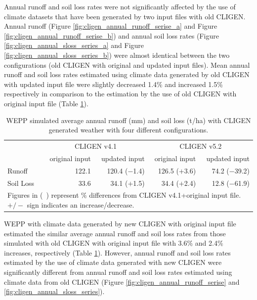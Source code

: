 Annual runoff and soil loss rates were not significantly affected by the use of
climate datasets that have been generated by two input files with old CLIGEN.
Annual runoff (Figure \ref{fig:cligen_annual_runoff_serise_a} and Figure
\ref{fig:cligen_annual_runoff_serise_b}) and annual soil loss rates (Figure
\ref{fig:cligen_annual_sloss_series_a} and Figure
\ref{fig:cligen_annual_sloss_series_b}) were almost identical between the two
configurations (old CLIGEN with original and updated input files). Mean annual
runoff and soil loss rates estimated using climate data generated by old CLIGEN
with updated input file were slightly decreased 1.4\% and increased 1.5\%
respectively in comparison to the estimation by the use of old CLIGEN with
original input file (Table
\ref{tab:SimualtedAnnualRunoffAndSoilLossWithDifferentConfiguration}).

\begin{table}[htbp]
  \centering
  \caption[WEPP simulated average annual runoff and soil loss]{WEPP
simulated average annual runoff (mm) and soil loss (t/ha) with CLIGEN generated
weather with four different configurations.}
  \label{tab:SimualtedAnnualRunoffAndSoilLossWithDifferentConfiguration}
    \begin{tabular}{lrrrr}
      \toprule
       & \multicolumn{2}{c}{CLIGEN v4.1} &
\multicolumn{2}{c}{CLIGEN v5.2}\\
      \cmidrule(r){2-3}\cmidrule(l){4-5}
       & original input & updated input & original input &
updated input \\
      \midrule
      Runoff & 122.1 & 120.4 ($-$1.4) & 126.5 ($+$3.6) & 74.2
($-$39.2)\\
      Soil Loss & 33.6 & 34.1 ($+$1.5) & 34.4 ($+$2.4) & 12.8
($-$61.9)\\
      \bottomrule
      \multicolumn{5}{p{10.5cm}}{\footnotesize Figures in (\ )
represent \% differences from CLIGEN v4.1+original input file. $+/-$ sign
indicates an increase/decrease.}
    \end{tabular}
\end{table}

WEPP with climate data generated by new CLIGEN with original input file
estimated the similar average annual runoff and soil loss rates from those
simulated with old CLIGEN with original input file with 3.6\% and 2.4\%
increases, respectively (Table
\ref{tab:SimualtedAnnualRunoffAndSoilLossWithDifferentConfiguration}). However,
annual runoff and soil loss rates estimated by the use of climate data generated
with new CLIGEN were significantly different from annual runoff and soil loss
rates estimated using climate data from old CLIGEN (Figure
\ref{fig:cligen_annual_runoff_serise} and \ref{fig:cligen_annual_sloss_series}).

